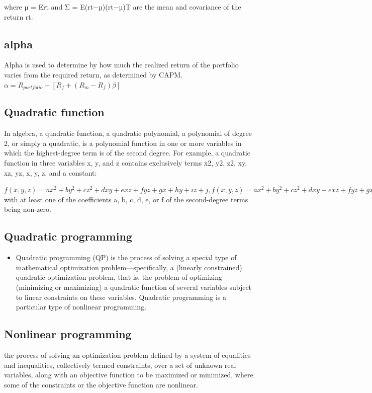 \documentclass[presentation]{beamer}
\begin{document}
where µ = Ert and Σ = E(rt−µ)(rt−µ)T are the mean and covariance of the return rt.
\subsection{alpha}
\label{sec:orgheadline1}
Alpha is used to determine by how much the realized return of the portfolio varies from the required return, as determined by CAPM.
\(\alpha = R_{portfolio} - [R_f + (R_m - R_f)\beta]\)
\subsection{Quadratic function}
\label{sec:orgheadline1}
In algebra, a quadratic function, a quadratic polynomial, a polynomial of degree 2, or simply a quadratic, is a polynomial function in one or more variables in which the highest-degree term is of the second degree. For example, a quadratic function in three variables x, y, and z contains exclusively terms x2, y2, z2, xy, xz, yz, x, y, z, and a constant:

\({\displaystyle f(x,y,z)=ax^{2}+by^{2}+cz^{2}+dxy+exz+fyz+gx+hy+iz+j,} f(x,y,z)=ax^{2}+by^{2}+cz^{2}+dxy+exz+fyz+gx+hy+iz+j,\)
with at least one of the coefficients a, b, c, d, e, or f of the second-degree terms being non-zero.

\subsection{Quadratic programming}
\label{sec:orgheadline1}
\begin{itemize}
\item Quadratic programming (QP) is the process of solving a special type of mathematical optimization problem—specifically, a (linearly constrained) quadratic optimization problem, that is, the problem of optimizing (minimizing or maximizing) a quadratic function of several variables subject to linear constraints on these variables. Quadratic programming is a particular type of nonlinear programming.
\end{itemize}
\subsection{Nonlinear programming}
\label{sec:orgheadline1}
the process of solving an optimization problem defined by a system of equalities and inequalities, collectively termed constraints, over a set of unknown real variables, along with an objective function to be maximized or minimized, where some of the constraints or the objective function are nonlinear.
\end{document}
